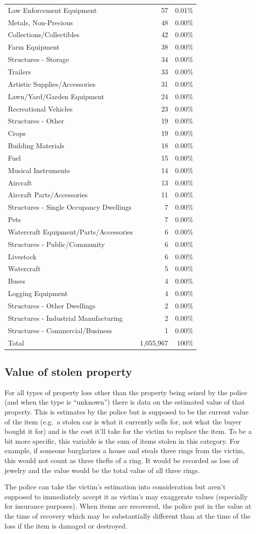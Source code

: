 \documentclass[
  12pt,
  openany]{book}
\begin{document}
\begin{longtable}[]{@{}lrr@{}}
Law Enforcement Equipment & 57 & 0.01\%\tabularnewline
Metals, Non-Precious & 48 & 0.00\%\tabularnewline
Collections/Collectibles & 42 & 0.00\%\tabularnewline
Farm Equipment & 38 & 0.00\%\tabularnewline
Structures - Storage & 34 & 0.00\%\tabularnewline
Trailers & 33 & 0.00\%\tabularnewline
Artistic Supplies/Accessories & 31 & 0.00\%\tabularnewline
Lawn/Yard/Garden Equipment & 24 & 0.00\%\tabularnewline
Recreational Vehicles & 23 & 0.00\%\tabularnewline
Structures - Other & 19 & 0.00\%\tabularnewline
Crops & 19 & 0.00\%\tabularnewline
Building Materials & 18 & 0.00\%\tabularnewline
Fuel & 15 & 0.00\%\tabularnewline
Musical Instruments & 14 & 0.00\%\tabularnewline
Aircraft & 13 & 0.00\%\tabularnewline
Aircraft Parts/Accessories & 11 & 0.00\%\tabularnewline
Structures - Single Occupancy Dwellings & 7 & 0.00\%\tabularnewline
Pets & 7 & 0.00\%\tabularnewline
Watercraft Equipment/Parts/Accessories & 6 & 0.00\%\tabularnewline
Structures - Public/Community & 6 & 0.00\%\tabularnewline
Livestock & 6 & 0.00\%\tabularnewline
Watercraft & 5 & 0.00\%\tabularnewline
Buses & 4 & 0.00\%\tabularnewline
Logging Equipment & 4 & 0.00\%\tabularnewline
Structures - Other Dwellings & 2 & 0.00\%\tabularnewline
Structures - Industrial Manufacturing & 2 & 0.00\%\tabularnewline
Structures - Commercial/Business & 1 & 0.00\%\tabularnewline
Total & 1,055,967 & 100\%\tabularnewline
\bottomrule
\end{longtable}

\hypertarget{value-of-stolen-property}{%
\subsection{Value of stolen property}\label{value-of-stolen-property}}

For all types of property loss other than the property being seized by the police (and when the type is ``unknown'') there is data on the estimated value of that property. This is estimates by the police but is supposed to be the current value of the item (e.g.~a stolen car is what it currently sells for, not what the buyer bought it for) and is the cost it'll take for the victim to replace the item. To be a bit more specific, this variable is the sum of items stolen in this category. For example, if someone burglarizes a house and steals three rings from the victim, this would not count as three thefts of a ring. It would be recorded as loss of jewelry and the value would be the total value of all three rings.

The police can take the victim's estimation into consideration but aren't supposed to immediately accept it as victim's may exaggerate values (especially for insurance purposes). When items are recovered, the police put in the value at the time of recovery which may be substantially different than at the time of the loss if the item is damaged or destroyed.
\end{document}
